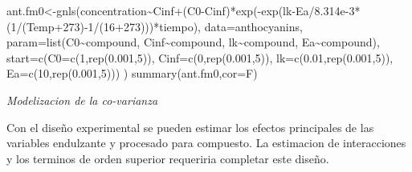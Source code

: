\documentclass[
]{article}
\newenvironment{Shaded}{\begin{snugshade}}{\end{snugshade}}
\newcommand{\AttributeTok}[1]{\textcolor[rgb]{0.77,0.63,0.00}{#1}}
\newcommand{\DecValTok}[1]{\textcolor[rgb]{0.00,0.00,0.81}{#1}}
\newcommand{\FloatTok}[1]{\textcolor[rgb]{0.00,0.00,0.81}{#1}}
\newcommand{\FunctionTok}[1]{\textcolor[rgb]{0.00,0.00,0.00}{#1}}
\newcommand{\NormalTok}[1]{#1}
\newcommand{\OtherTok}[1]{\textcolor[rgb]{0.56,0.35,0.01}{#1}}
\newcommand{\SpecialCharTok}[1]{\textcolor[rgb]{0.00,0.00,0.00}{#1}}
\begin{document}
\begin{Shaded}
\begin{Highlighting}[]
\NormalTok{ant.fm0}\OtherTok{\textless{}{-}}\FunctionTok{gnls}\NormalTok{(concentration}\SpecialCharTok{\textasciitilde{}}\NormalTok{Cinf}\SpecialCharTok{+}\NormalTok{(C0}\SpecialCharTok{{-}}\NormalTok{Cinf)}\SpecialCharTok{*}\FunctionTok{exp}\NormalTok{(}\SpecialCharTok{{-}}\FunctionTok{exp}\NormalTok{(lk}\SpecialCharTok{{-}}\NormalTok{Ea}\SpecialCharTok{/}\FloatTok{8.314e{-}3}\SpecialCharTok{*}\NormalTok{(}\DecValTok{1}\SpecialCharTok{/}\NormalTok{(Temp}\SpecialCharTok{+}\DecValTok{273}\NormalTok{)}\SpecialCharTok{{-}}\DecValTok{1}\SpecialCharTok{/}\NormalTok{(}\DecValTok{16}\SpecialCharTok{+}\DecValTok{273}\NormalTok{)))}\SpecialCharTok{*}\NormalTok{tiempo),}
              \AttributeTok{data=}\NormalTok{anthocyanins,}
              \AttributeTok{param=}\FunctionTok{list}\NormalTok{(C0}\SpecialCharTok{\textasciitilde{}}\NormalTok{compound,}
\NormalTok{                         Cinf}\SpecialCharTok{\textasciitilde{}}\NormalTok{compound,}
\NormalTok{                         lk}\SpecialCharTok{\textasciitilde{}}\NormalTok{compound,}
\NormalTok{                         Ea}\SpecialCharTok{\textasciitilde{}}\NormalTok{compound),}
              \AttributeTok{start=}\FunctionTok{c}\NormalTok{(}\AttributeTok{C0=}\FunctionTok{c}\NormalTok{(}\DecValTok{1}\NormalTok{,}\FunctionTok{rep}\NormalTok{(}\FloatTok{0.001}\NormalTok{,}\DecValTok{5}\NormalTok{)),}
                      \AttributeTok{Cinf=}\FunctionTok{c}\NormalTok{(}\DecValTok{0}\NormalTok{,}\FunctionTok{rep}\NormalTok{(}\FloatTok{0.001}\NormalTok{,}\DecValTok{5}\NormalTok{)),}
                      \AttributeTok{lk=}\FunctionTok{c}\NormalTok{(}\FloatTok{0.01}\NormalTok{,}\FunctionTok{rep}\NormalTok{(}\FloatTok{0.001}\NormalTok{,}\DecValTok{5}\NormalTok{)),}
                      \AttributeTok{Ea=}\FunctionTok{c}\NormalTok{(}\DecValTok{10}\NormalTok{,}\FunctionTok{rep}\NormalTok{(}\FloatTok{0.001}\NormalTok{,}\DecValTok{5}\NormalTok{)))}
\NormalTok{)}
\FunctionTok{summary}\NormalTok{(ant.fm0,}\AttributeTok{cor=}\NormalTok{F)}
\end{Highlighting}
\end{Shaded}

\emph{Modelizacion de la co-varianza}

Con el diseño experimental se pueden estimar los efectos principales de
las variables endulzante y procesado para compuesto. La estimacion de
interacciones y los terminos de orden superior requeriria completar este
diseño.
\end{document}
